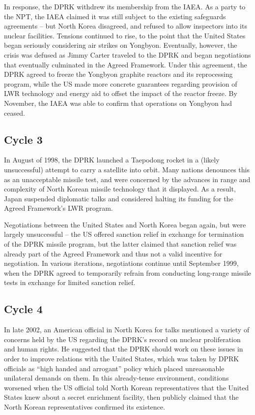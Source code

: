 \documentclass{article}
\begin{document}
In response, the DPRK withdrew its membership from the IAEA. As a party to the NPT, the IAEA claimed it was still subject to the existing safeguards agreements – but North Korea disagreed, and refused to allow inspectors into its nuclear facilities\cite{iaea09}. Tensions continued to rise, to the point that the United States began seriously considering air strikes on Yongbyon\cite{jun}. Eventually, however, the crisis was defused as Jimmy Carter traveled to the DPRK and began negotiations that eventually culminated in the Agreed Framework\cite{nti15}. Under this agreement, the DPRK agreed to freeze the Yongbyon graphite reactors and its reprocessing program, while the US made more concrete guarantees regarding provision of LWR technology and energy aid to offset the impact of the reactor freeze\cite{agreed}. By November, the IAEA was able to confirm that operations on Yongbyon had ceased\cite{davenport}.

\subsection{Cycle 3}

In August of 1998, the DPRK launched a Taepodong rocket in a (likely unsuccessful) attempt to carry a satellite into orbit\cite{orfall}. Many nations denounces this as an unacceptable missile test, and were concerned by the advances in range and complexity of North Korean missile technology that it displayed\cite{orfall}. As a result, Japan suspended diplomatic talks and considered halting its funding for the Agreed Framework’s LWR program\cite{orfall}.

Negotiations between the United States and North Korea began again, but were largely unsuccessful – the US offered sanction relief in exchange for termination of the DPRK missile program, but the latter claimed that sanction relief was already part of the Agreed Framework and thus not a valid incentive for negotiation\cite{davenport}. In various iterations, negotiations continue until September 1999, when the DPRK agreed to temporarily refrain from conducting long-range missile tests in exchange for limited sanction relief\cite{davenport}.

\subsection{Cycle 4}

In late 2002, an American official in North Korea for talks mentioned a variety of concerns held by the US regarding the DPRK’s record on nuclear proliferation and human rights\cite{davenport}. He suggested that the DPRK should work on these issues in order to improve relations with the United States, which was taken by DPRK officials as “high handed and arrogant” policy which placed unreasonable unilateral demands on them\cite{kcna3}. In this already-tense environment, conditions worsened when the US official told North Korean representatives that the United States knew about a secret enrichment facility, then publicly claimed that the North Korean representatives confirmed its existence\cite{davenport}. 
\end{document}
